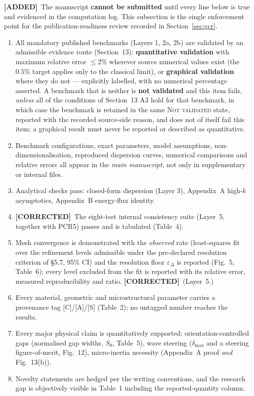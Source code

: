 \documentclass[11pt,a4paper]{article}
\newcommand{\ADDED}{{\color{addcol}\textbf{[ADDED]}}}
\newcommand{\COR}{{\color{corcol}\textbf{[CORRECTED]}}}
\begin{document}
\ADDED\ The manuscript \textbf{cannot be submitted} until every line below is true and
evidenced in the computation log. This subsection is the single enforcement point for
the publication-readiness review recorded in Section~\ref{sec:gcr}.

\begin{enumerate}[label=\textbf{PCR\arabic*.}]
\item All mandatory published benchmarks (Layers 1, 2a, 2b) are validated by an admissible
evidence route (Section~13): \textbf{quantitative validation} with maximum relative error
$\le2\%$ wherever source numerical values exist (the $0.5\%$ target applies only to the
classical limit), or \textbf{graphical validation} where they do not --- explicitly labelled,
with no numerical percentage asserted. A benchmark that is neither is \textbf{not validated}
and this item fails, \emph{unless} all of the conditions of Section~13 A3 hold for that benchmark, in
which case the benchmark is retained in the same \textsc{Not validated} state, reported with the
recorded source-side reason, and does not of itself fail this item; a graphical result must never be
reported or described as quantitative.
\item Benchmark configurations, exact parameters, model assumptions, non-dimensionalisation,
reproduced dispersion curves, numerical comparisons and relative errors all appear in the
\emph{main manuscript}, not only in supplementary or internal files.
\item Analytical checks pass: closed-form dispersion (Layer 3), Appendix~A high-$k$
asymptotics, Appendix~B energy-flux identity.
\item \COR\ The eight-test internal consistency suite (Layer~5, together with PCR5) passes and is tabulated (Table~4).
\item Mesh convergence is demonstrated with the \emph{observed} rate (least-squares fit over the refinement levels admissible under the pre-declared resolution criterion of \S5.7, 95\% CI) and the resolution floor $\varepsilon_\Delta$ is reported (Fig.~5, Table~6); every level excluded from the fit is reported with its relative error, measured reproducibility and ratio. \COR\ (Layer~5.)
\item Every material, geometric and microstructural parameter carries a provenance tag
[C]/[A]/[S] (Table~2); no untagged number reaches the results.
\item Every major physical claim is quantitatively supported: orientation-controlled gaps
(normalised gap widths, $S_\theta$, Table~5), wave steering ($\delta_{\max}$ and a steering
figure-of-merit, Fig.~12), micro-inertia necessity (Appendix~A proof \emph{and} Fig.~13(b)).
\item Novelty statements are hedged per the writing conventions, and the research gap is
objectively visible in Table~1 including the reported-quantity column.
\end{enumerate}
\end{document}
